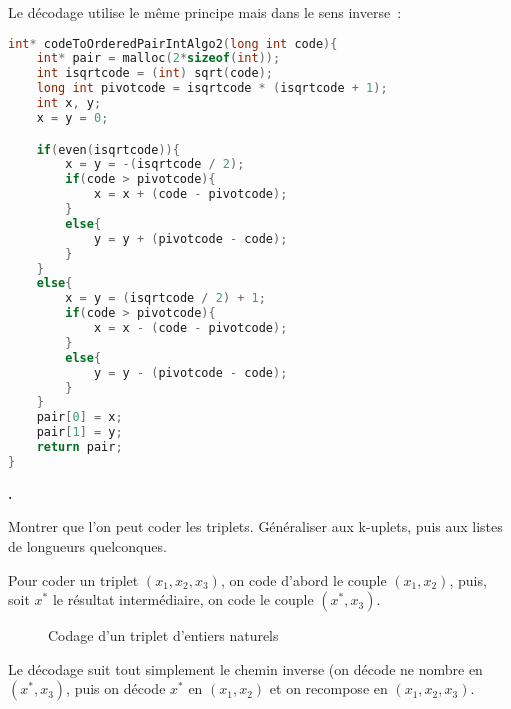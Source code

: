 \documentclass{article}
\newcounter{enoncecount}
\newenvironment{enonce}
{
\stepcounter{enoncecount}
\bf\small \arabic{enoncecount}.
\begin{bf}
}
{
\end{bf}
}
\begin{document}
Le décodage utilise le même principe mais dans le sens inverse~:

\begin{lstlisting}[language=C]
int* codeToOrderedPairIntAlgo2(long int code){
	int* pair = malloc(2*sizeof(int));
	int isqrtcode = (int) sqrt(code);
	long int pivotcode = isqrtcode * (isqrtcode + 1);
	int x, y;
	x = y = 0;	

	if(even(isqrtcode)){
		x = y = -(isqrtcode / 2);
		if(code > pivotcode){
			x = x + (code - pivotcode);
		}
		else{
			y = y + (pivotcode - code);
		}
	}
	else{
		x = y = (isqrtcode / 2) + 1;
		if(code > pivotcode){
			x = x - (code - pivotcode);
		}
		else{
			y = y - (pivotcode - code); 
		}
	}
	pair[0] = x;
	pair[1] = y; 
	return pair;
}
\end{lstlisting}



\begin{enonce}
Montrer que l'on peut coder les triplets. Généraliser aux k-uplets, puis aux listes de longueurs quelconques.
\end{enonce}

Pour coder un triplet $(x_1, x_2, x_3)$, on code d'abord le couple $(x_1, x_2)$, puis, soit $x^*$ le résultat intermédiaire, on code le couple $(x^*, x_3)$.

\begin{figure}[h!]
  \centering
  \caption{Codage d'un triplet d'entiers naturels}
  \label{fig:codage-couple}
\end{figure}

Le décodage suit tout simplement le chemin inverse (on décode ne nombre en $(x^*, x_3)$, puis on décode $x^*$ en $(x_1, x_2)$ et on recompose en $(x_1, x_2, x_3)$.
\end{document}
